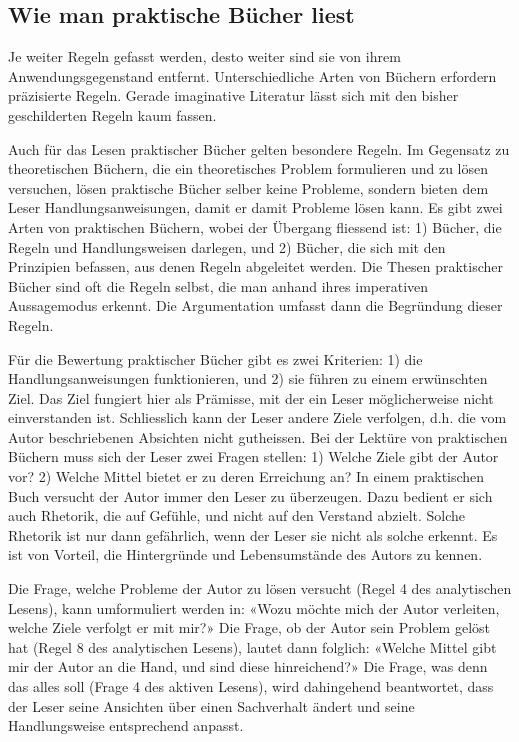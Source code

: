 \documentclass[a4paper,11pt]{scrartcl}
\begin{document}
\subsection{Wie man praktische Bücher liest}

Je weiter Regeln gefasst werden, desto weiter sind sie von ihrem Anwendungsgegenstand entfernt. Unterschiedliche Arten von Büchern erfordern präzisierte Regeln. Gerade imaginative Literatur lässt sich mit den bisher geschilderten Regeln kaum fassen.

Auch für das Lesen praktischer Bücher gelten besondere Regeln. Im Gegensatz zu theoretischen Büchern, die ein theoretisches Problem formulieren und zu lösen versuchen, lösen praktische Bücher selber keine Probleme, sondern bieten dem Leser Handlungsanweisungen, damit er damit Probleme lösen kann. Es gibt zwei Arten von praktischen Büchern, wobei der Übergang fliessend ist: 1) Bücher, die Regeln und Handlungsweisen darlegen, und 2) Bücher, die sich mit den Prinzipien befassen, aus denen Regeln abgeleitet werden. Die Thesen praktischer Bücher sind oft die Regeln selbst, die man anhand ihres imperativen Aussagemodus erkennt. Die Argumentation umfasst dann die Begründung dieser Regeln.

Für die Bewertung praktischer Bücher gibt es zwei Kriterien: 1) die Handlungsanweisungen funktionieren, und 2) sie führen zu einem erwünschten Ziel. Das Ziel fungiert hier als Prämisse, mit der ein Leser möglicherweise nicht einverstanden ist. Schliesslich kann der Leser andere Ziele verfolgen, d.h. die vom Autor beschriebenen Absichten nicht gutheissen. Bei der Lektüre von praktischen Büchern muss sich der Leser zwei Fragen stellen: 1) Welche Ziele gibt der Autor vor? 2) Welche Mittel bietet er zu deren Erreichung an? In einem praktischen Buch versucht der Autor immer den Leser zu überzeugen. Dazu bedient er sich auch Rhetorik, die auf Gefühle, und nicht auf den Verstand abzielt. Solche Rhetorik ist nur dann gefährlich, wenn der Leser sie nicht als solche erkennt. Es ist von Vorteil, die Hintergründe und Lebensumstände des Autors zu kennen.

Die Frage, welche Probleme der Autor zu lösen versucht (Regel 4 des analytischen Lesens), kann umformuliert werden in: «Wozu möchte mich der Autor verleiten, welche Ziele verfolgt er mit mir?» Die Frage, ob der Autor sein Problem gelöst hat (Regel 8 des analytischen Lesens), lautet dann folglich: «Welche Mittel gibt mir der Autor an die Hand, und sind diese hinreichend?» Die Frage, was denn das alles soll (Frage 4 des aktiven Lesens), wird dahingehend beantwortet, dass der Leser seine Ansichten über einen Sachverhalt ändert und seine Handlungsweise entsprechend anpasst.
\end{document}

